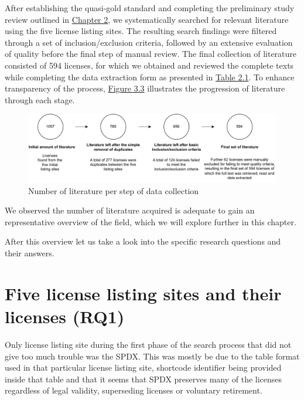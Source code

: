 After establishing the quasi-gold standard and completing the preliminary study review outlined in \hyperref[methods]{Chapter 2}, we systematically searched for relevant literature using the five license listing sites. The resulting search findings were filtered through a set of inclusion/exclusion criteria, followed by an extensive evaluation of quality before the final step of manual review. The final collection of literature consisted of 594 licenses, for which we obtained and reviewed the complete texts while completing the data extraction form as presented in \hyperref[table:extraction]{Table 2.1}. To enhance transparency of the process, \hyperref[fig:3-3]{Figure 3.3} illustrates the progression of literature through each stage.
\begin{figure}
	\centering
	\includegraphics[scale=0.8]{figures/figure-3-3.pdf}
	\caption{Number of literature per step of data collection}
	\label{fig:3-3}
\end{figure}
We observed the number of literature acquired is adequate to gain an representative overview of the field, which we will explore further in this chapter.

After this overview let us take a look into the specific research questions and their answers.

\section{Five license listing sites and their licenses (RQ1)}
Only license listing site during the first phase of the search process that did not give too much trouble was the SPDX. This was mostly be due to the table format used in that particular license listing site, shortcode identifier being provided inside that table and that it seems that SPDX preserves many of the licenses regardless of legal validity, superseding licenses or voluntary retirement.

